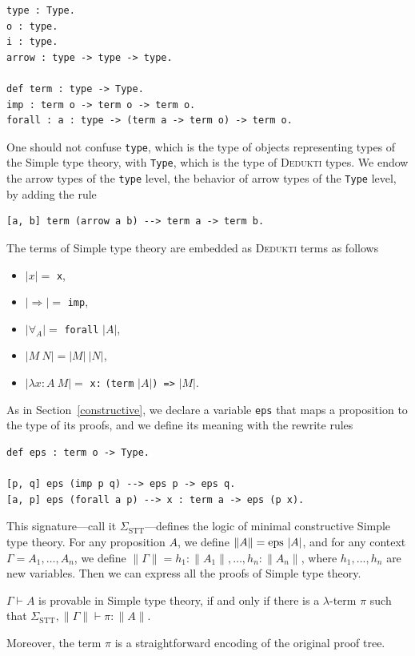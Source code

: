 \documentclass[english]{lipics}
\newcommand\lst[1]{{\rm \lstinline{#1}}}
\begin{document}
\begin{lstlisting}
type : Type.
o : type.
i : type.
arrow : type -> type -> type.

def term : type -> Type.
imp : term o -> term o -> term o.
forall : a : type -> (term a -> term o) -> term o.
\end{lstlisting}
One should not confuse \lst{type}, which is the type of objects
representing types of the Simple type theory, with \lst{Type}, which
is the type of \textsc{Dedukti} types. We endow the arrow types of the
\lst{type} level, the behavior of arrow types of the \lst{Type} level,
by adding the rule
\begin{lstlisting}
[a, b] term (arrow a b) --> term a -> term b.
\end{lstlisting}

\begin{definition}
The terms of Simple type theory are embedded as \textsc{Dedukti} terms
as follows
\begin{itemize}
\item $|x| =$ \lst{x},
\item $|\Rightarrow| =$ \lst{imp},
\item $|\forall_A| = $ \lst{forall} $|A|$,
\item $|M~N| = |M|~|N|$,
\item $|\lambda x:A~M| = $ \lst{x:} \lst{(term} $|A|$\lst{) =>} $|M|$.
\end{itemize}
\end{definition}

As in Section~\ref{constructive}, we declare a variable \lst{eps} that
maps a proposition to the type of its proofs, and we define its
meaning with the rewrite rules
\begin{lstlisting}
def eps : term o -> Type.

[p, q] eps (imp p q) --> eps p -> eps q.
[a, p] eps (forall a p) --> x : term a -> eps (p x).
\end{lstlisting}

This signature---call it $\Sigma_{\mathrm{STT}}$---defines the logic of minimal
constructive Simple type theory. For any proposition $A$, we define $\|A\| =
\mbox{\lst{eps}}~|A|$, and for any context $\Gamma = A_1,\ldots,A_n$, we
define $\|\Gamma\| =
h_1:\|A_1\|,\ldots,h_n:\|A_n\|$, where $h_1, ..., h_n$ are new variables.
Then we can express all the proofs of
Simple type theory.
\begin{theorem}
$\Gamma \vdash A$ is provable in Simple type theory, if and only if
  there is a $\lambda$-term $\pi$ such that
  $\Sigma_{\mathrm{STT}},\|\Gamma\| \vdash \pi : \|A\|$.
\end{theorem}
Moreover, the term $\pi$ is a straightforward encoding of the original
proof tree.
\end{document}
